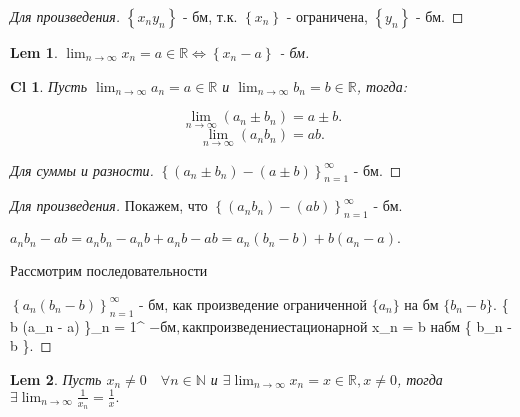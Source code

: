 \documentclass[a5paper, 10pt]{article}
\theoremstyle{plain}
\newtheorem*{lemma}{Lem}
\newtheorem*{corollary_}{Cl}
\newcommand{\N}{\mathbb N}
\newcommand{\R}{\mathbb R}
\newcommand{\Lrarrow}{\Leftrightarrow}
\begin{document}
    \begin{proof}[Для произведения]
        $ \left\{ x_n y_n \right\} $ - бм, т.к. $ \left\{ x_n \right\} $ - ограничена,
        $ \left\{ y_n \right\} $ - бм.
    \end{proof}

    \begin{lemma}
    $ \lim_{n \to \infty} x_n = a \in \R \Lrarrow \left\{ x_n - a \right\} $ - бм.
    \end{lemma}

    \begin{corollary_}
        Пусть $ \lim_{n \to \infty} a_n = a \in \R $ и $ \lim_{n \to \infty} b_n = b \in \R $,
        тогда:

        \[ \lim_{n \to \infty} (a_n \pm b_n) = a \pm b. \]
        \[ \lim_{n \to \infty} (a_n b_n) = a b. \]
    \end{corollary_}

    \begin{proof}[Для суммы и разности]
        $ \left\{ (a_n \pm b_n) - (a \pm b) \right\}_{n = 1}^{\infty} $ - бм.
    \end{proof}

    \begin{proof}[Для произведения]
        Покажем, что
        $ \left\{ (a_n b_n) - (a b) \right\}_{n = 1}^{\infty} $ - бм.

        $ a_n b_n - ab = a_n b_n - a_n b + a_n b - ab = a_n (b_n - b) + b (a_n - a). $

        Рассмотрим последовательности

        $ \left\{ a_n (b_n - b) \right\}_{n = 1}^{\infty} $ - бм, как произведение
        ограниченной $ \{ a_n \} $ на бм $ \{ b_n - b \}.

        $ \left\{ b (a_n - a) \right\}_{n = 1}^{\infty} $ - бм, как произведение
        стационарной $ x_n = b $ на бм $ \{ b_n - b \}.
    \end{proof}

    \begin{lemma}
        Пусть $ x_n \neq 0 \quad \forall n \in \N $ и $ \exists \lim_{n \to \infty} x_n = x \in \R,
        x \neq 0 $, тогда $ \exists \lim_{n \to \infty} \frac{1}{x_n} = \frac{1}{x}. $
    \end{lemma}
\end{document}
